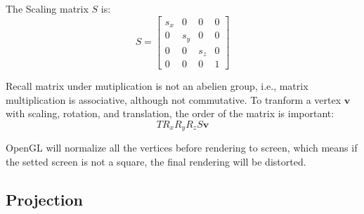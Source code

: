 \documentclass[12pt, a4paper]{article}
\theoremstyle{definition}
\theoremstyle{remark}
\begin{document}
The Scaling matrix $S$ is:
\begin{equation}\label{eq:scaling}
	S = 
	\begin{bmatrix}
	s_x & 0 & 0 & 0\\
	0 & s_y & 0 & 0\\
	0 & 0 & s_z & 0\\
	0 & 0 & 0 & 1
	\end{bmatrix}
\end{equation}

Recall matrix under mutiplication is not an abelien group, i.e., matrix multiplication is associative, although not commutative.
To tranform a vertex $\bm{v}$ with scaling, rotation, and translation, the order of the matrix is important:
\begin{equation}\label{eq:combinedTransformation}
TR_xR_yR_zS\bm{v}
\end{equation}

OpenGL will normalize all the vertices before rendering to screen, which means if the setted screen is not a square, the final rendering will be distorted.

\subsection{Projection}
\end{document}
